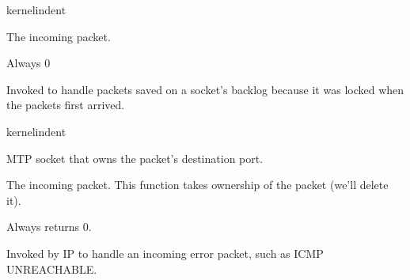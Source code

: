 \documentclass[letterpaper,10pt,english]{sphinxmanual}
\begin{document}
\begin{sphinxuseclass}{kernelindent}
\sphinxAtStartPar
{}
\begin{description}
\sphinxAtStartPar
The incoming packet.

\end{description}

\sphinxAtStartPar
{}

\sphinxAtStartPar
Always 0

\end{sphinxuseclass}

\begin{fulllineitems}
\label{\detokenize{mtpimpl.c:c.MTP_backlog_rcv}}
\pysigstartsignatures
\pysigstartmultiline
{}
\pysigstopmultiline
\pysigstopsignatures
\sphinxAtStartPar
Invoked to handle packets saved on a socket’s backlog because it was locked when the packets first arrived.

\end{fulllineitems}


\begin{sphinxuseclass}{kernelindent}
\sphinxAtStartPar
{}
\begin{description}
\sphinxAtStartPar
MTP socket that owns the packet’s destination port.

\sphinxAtStartPar
The incoming packet. This function takes ownership of the packet
(we’ll delete it).

\end{description}

\sphinxAtStartPar
{}

\sphinxAtStartPar
Always returns 0.

\end{sphinxuseclass}

\begin{fulllineitems}
\label{\detokenize{mtpimpl.c:c.MTP_err_handler_v4}}
\pysigstartsignatures
\pysigstartmultiline
{}
\pysigstopmultiline
\pysigstopsignatures
\sphinxAtStartPar
Invoked by IP to handle an incoming error packet, such as ICMP UNREACHABLE.

\end{fulllineitems}
\end{document}
